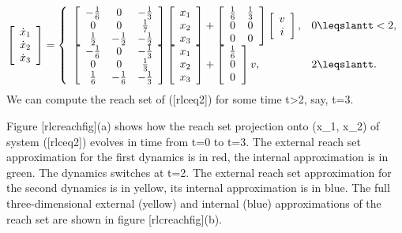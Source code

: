 \documentclass[letterpaper,10pt,english]{sphinxmanual}
\begin{document}
\begin{gather}
\begin{split}\left[\begin{array}{c}
\dot{x}_1\\
\dot{x}_2\\
\dot{x}_3\end{array}\right] = \left\{\begin{array}{ll}
\left[\begin{array}{ccc}
-\frac{1}{6} & 0 & -\frac{1}{3}\\
0 & 0 & \frac{1}{7}\\
\frac{1}{2} & -\frac{1}{2} & -\frac{1}{2}\end{array}\right]
\left[\begin{array}{c}
x_1\\
x_2\\
x_3\end{array}\right] + \left[\begin{array}{cc}
\frac{1}{6} & \frac{1}{3}\\
0 & 0\\
0 & 0\end{array}\right]\left[\begin{array}{c}
v\\
i\end{array}\right], & 0\leqslantt< 2, \\
\left[\begin{array}{ccc}
-\frac{1}{6} & 0 & -\frac{1}{3}\\
0 & 0 & \frac{1}{3}\\
\frac{1}{6} & -\frac{1}{6} & -\frac{1}{3}\end{array}\right]
\left[\begin{array}{c}
x_1\\
x_2\\
x_3\end{array}\right] + \left[\begin{array}{c}
\frac{1}{6} \\
0 \\
0 \end{array}\right]v, & 2\leqslantt. \end{array}\right.
\label{rlceq2}\end{split}\notag
\end{gather}
We can compute the reach set of ({[}rlceq2{]}) for some time t>2,
say, t=3.

Figure {[}rlcreachfig{]}(a) shows how the reach set projection onto
(x_1, x_2) of system ({[}rlceq2{]}) evolves in time from t=0
to t=3. The external reach set approximation for the first
dynamics is in red, the internal approximation is in green. The dynamics
switches at t=2. The external reach set approximation for the
second dynamics is in yellow, its internal approximation is in blue. The
full three-dimensional external (yellow) and internal (blue)
approximations of the reach set are shown in figure {[}rlcreachfig{]}(b).
\end{document}
